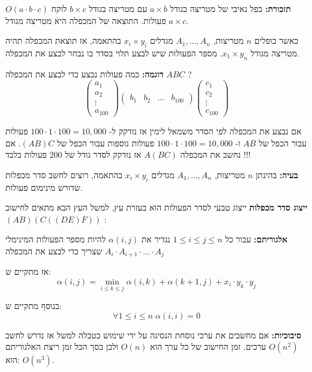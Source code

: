 \textbf{תזכורת:}
כפל נאיבי של מטריצה בגודל 
$a \times b$
עם מטריצה בגודל 
$b \times c$
לוקח 
$O(a \cdot b \cdot c)$
פעולות.
התוצאה של המכפלה היא מטריצה מגודל 
$a \times c$.

כאשר כופלים $n$ מטריצות, 
$A_1,\ldots,A_n$
מגדלים 
$x_i \times y_i$
בהתאמה, אז תוצאת המכפלה תהיה מטריצה מגודל
$x_1 \times y_n$.
מספר הפעולות שיש לבצע תלוי בסדר בו נבחר לבצע את המכפלה.

\textbf{דוגמה:}
כמה פעולות נבצע כדי לבצע את המכפלה
$ABC$
?
$$
\begin{pmatrix}
a_{1}
\\
a_{2}
\\
\vdots
\\
a_{100}
\end{pmatrix}
%
\begin{pmatrix}
b_{1}	&	b_{2} & \dots &  b_{100}
\end{pmatrix}
%
\begin{pmatrix}
c_{1}
\\
c_{2}
\\
\vdots
\\
c_{100}
\end{pmatrix}
$$

אם נבצע את המכפלה לפי הסדר משמאל לימין אז נזדקק ל-%
$100 \cdot 1 \cdot 100 = 10,000$
פעולות עבור הכפל של 
$AB$
ו-%
$100 \cdot 1 \cdot 100 = 10,000$
פעולות נוספות עבור הכפל של
$(AB)C$.
אם נחשב את המכפלה
$A(BC)$
אז נזדקק לסדר גודל של 200 פעולות בלבד !!!

\textbf{בעיה:}
בהינתן $n$ מטריצות, 
$A_1,\ldots,A_n$
מגדלים 
$x_i \times y_i$
בהתאמה, רוצים לחשב סדר מכפלות שדורש מינימום פעולות.

\textbf{ייצוג סדר מכפלות}
ייצוג טבעי לסדר הפעולות הוא בעזרת עץ, למשל העץ הבא מתאים לחישוב
$(AB)(C((DE)F))$
:
\begin{center}
\end{center}


\textbf{אלגוריתם:}
עבור כל 
$1 \leq i \leq j \leq n$
נגדיר את
$\alpha(i, j)$
להיות מספר הפעולות המינימלי שצריך כדי לבצע את המכפלה
$A_i \cdot A_{i + 1} \cdot \ldots \cdot A_j$

אז מתקיים ש:%
$$
\alpha(i, j) = \min_{i \leq k \leq j} 
\alpha(i, k) + \alpha(k + 1, j) + x_i \cdot y_k \cdot y_j

$$

בנוסף מתקיים ש:
$$
\forall 1 \leq i \leq n \; \alpha(i,i) = 0
$$

\textbf{סיבוכיות:}
אם מחשבים את ערכי נוסחת הנסיגה על ידי שימוש בטבלה למשל אז נדרש לחשב
$O(n^2)$
ערכים. 
זמן החישוב של כל ערך הוא 
$O(n)$
ולכן בסך הכל זמן ריצת האלגוריתם הוא:
$O(n^3)$.
